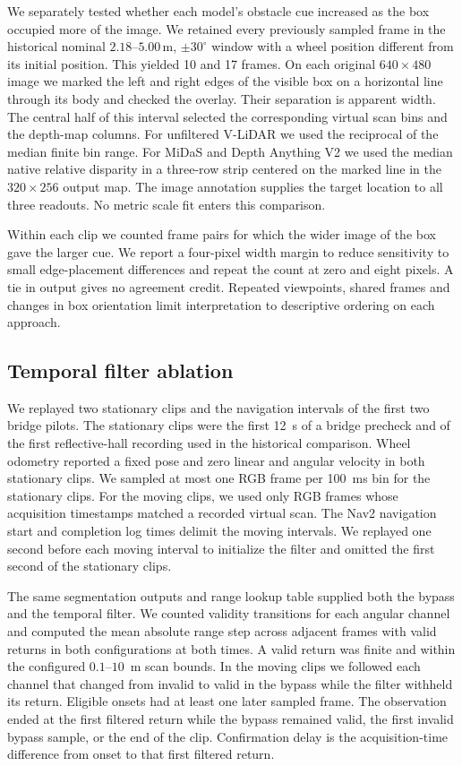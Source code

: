\documentclass[pdflatex,sn-mathphys-num]{sn-jnl}
\newcommand{\m}{\,\mathrm{m}}
\begin{document}
We separately tested whether each model's obstacle cue increased as the box occupied more of the image. We retained every previously sampled frame in the historical nominal $2.18$--$5.00\m$, $\pm30^\circ$ window with a wheel position different from its initial position. This yielded 10 and 17 frames. On each original $640\times480$ image we marked the left and right edges of the visible box on a horizontal line through its body and checked the overlay. Their separation is apparent width. The central half of this interval selected the corresponding virtual scan bins and the depth-map columns. For unfiltered V-LiDAR we used the reciprocal of the median finite bin range. For MiDaS and Depth Anything V2 we used the median native relative disparity in a three-row strip centered on the marked line in the $320\times256$ output map. The image annotation supplies the target location to all three readouts. No metric scale fit enters this comparison.

Within each clip we counted frame pairs for which the wider image of the box gave the larger cue. We report a four-pixel width margin to reduce sensitivity to small edge-placement differences and repeat the count at zero and eight pixels. A tie in output gives no agreement credit. Repeated viewpoints, shared frames and changes in box orientation limit interpretation to descriptive ordering on each approach.

\subsection{Temporal filter ablation}

We replayed two stationary clips and the navigation intervals of the first two bridge pilots. The stationary clips were the first 12~s of a bridge precheck and of the first reflective-hall recording used in the historical comparison. Wheel odometry reported a fixed pose and zero linear and angular velocity in both stationary clips. We sampled at most one RGB frame per 100~ms bin for the stationary clips. For the moving clips, we used only RGB frames whose acquisition timestamps matched a recorded virtual scan. The Nav2 navigation start and completion log times delimit the moving intervals. We replayed one second before each moving interval to initialize the filter and omitted the first second of the stationary clips.

The same segmentation outputs and range lookup table supplied both the bypass and the temporal filter. We counted validity transitions for each angular channel and computed the mean absolute range step across adjacent frames with valid returns in both configurations at both times. A valid return was finite and within the configured $0.1$--$10$~m scan bounds. In the moving clips we followed each channel that changed from invalid to valid in the bypass while the filter withheld its return. Eligible onsets had at least one later sampled frame. The observation ended at the first filtered return while the bypass remained valid, the first invalid bypass sample, or the end of the clip. Confirmation delay is the acquisition-time difference from onset to that first filtered return.
\end{document}
